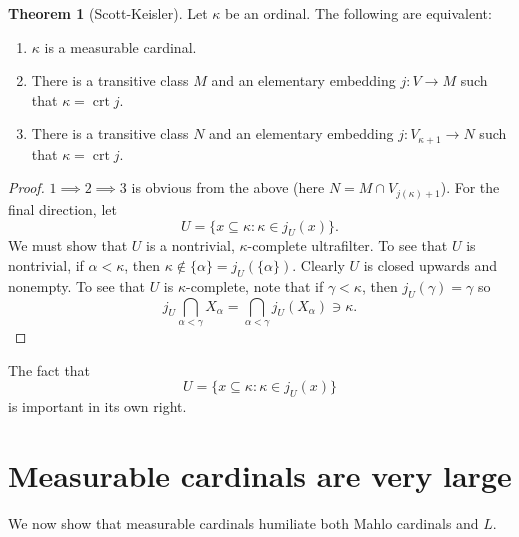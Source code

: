 \documentclass[12pt]{report}
\DeclareMathOperator{\crt}{crt}
\theoremstyle{definition}
\newtheorem{theorem}{Theorem}[chapter]
\begin{document}
\begin{theorem}[Scott-Keisler]
Let $\kappa$ be an ordinal. The following are equivalent:
\begin{enumerate}
\item $\kappa$ is a measurable cardinal.
\item There is a transitive class $M$ and an elementary embedding $j: V \to M$ such that $\kappa = \crt j$.
\item There is a transitive class $N$ and an elementary embedding $j: V_{\kappa + 1} \to N$ such that $\kappa = \crt j$.
\end{enumerate}
\end{theorem}
\begin{proof}
$1 \implies 2 \implies 3$ is obvious from the above (here $N = M \cap V_{j(\kappa) + 1}$). For the final direction, let
$$U = \{x \subseteq \kappa: \kappa \in j_U(x)\}.$$
We must show that $U$ is a nontrivial, $\kappa$-complete ultrafilter.
To see that $U$ is nontrivial, if $\alpha < \kappa$, then $\kappa \notin \{\alpha\} = j_U(\{\alpha\})$.
Clearly $U$ is closed upwards and nonempty. To see that $U$ is $\kappa$-complete, note that if $\gamma < \kappa$, then $j_U(\gamma) = \gamma$ so
$$j_U\bigcap_{\alpha < \gamma} X_\alpha = \bigcap_{\alpha < \gamma} j_U(X_\alpha) \ni \kappa.$$
\end{proof}
The fact that
$$U = \{x \subseteq \kappa: \kappa \in j_U(x)\}$$
is important in its own right.







\section{Measurable cardinals are very large}
We now show that measurable cardinals humiliate both Mahlo cardinals and $L$.
\end{document}
